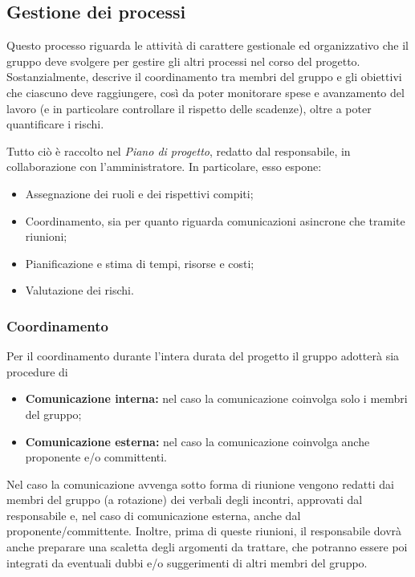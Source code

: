 \subsection{Gestione dei processi}\label{sec:processi_organizzativi:gestione_processi}
Questo processo riguarda le attività di carattere gestionale ed organizzativo che il gruppo deve svolgere per gestire gli altri processi nel corso del progetto. Sostanzialmente, descrive il coordinamento tra membri del gruppo e gli obiettivi che ciascuno deve raggiungere, così da poter monitorare spese e avanzamento del lavoro (e in particolare controllare il rispetto delle scadenze), oltre a poter quantificare i rischi.

Tutto ciò è raccolto nel \textit{Piano di progetto},
redatto dal responsabile, in collaborazione con l'amministratore. In particolare, esso espone:
\begin{itemize}
    \item Assegnazione dei ruoli e dei rispettivi compiti;
    \item Coordinamento, sia per quanto riguarda comunicazioni asincrone che tramite riunioni;
    \item Pianificazione e stima di tempi, risorse e costi;
    \item Valutazione dei rischi.
\end{itemize}

\subsubsection{Coordinamento}
Per il coordinamento durante l’intera durata del progetto il gruppo adotterà sia procedure di
\begin{itemize}
    \item \textbf{Comunicazione interna:} nel caso la comunicazione coinvolga solo i membri del gruppo;
    \item \textbf{Comunicazione esterna:} nel caso la comunicazione coinvolga anche proponente e/o committenti.
\end{itemize}
Nel caso la comunicazione avvenga sotto forma di riunione vengono redatti dai membri del gruppo (a rotazione) dei verbali degli incontri, approvati dal responsabile e, nel caso di comunicazione esterna, anche dal proponente/committente. Inoltre, prima di queste riunioni, il responsabile dovrà anche preparare una scaletta degli argomenti da trattare, che potranno essere poi integrati da eventuali dubbi e/o suggerimenti di altri membri del gruppo. 

